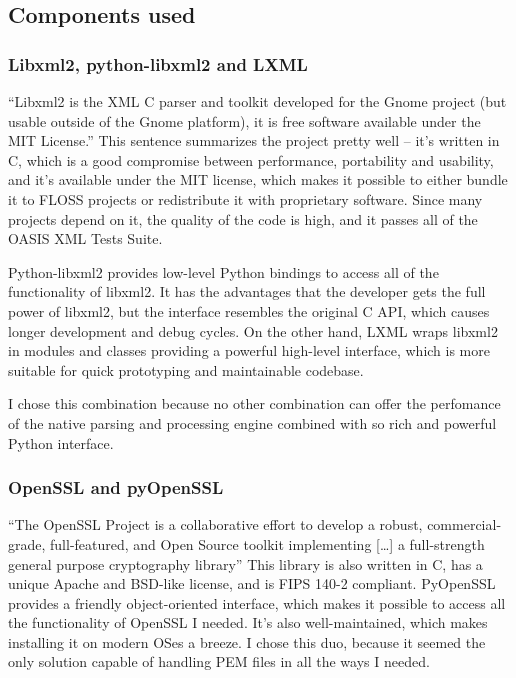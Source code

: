 \subsection{Components used}

\subsubsection{Libxml2, python-libxml2 and LXML}

``Libxml2 is the XML C parser and toolkit developed for the Gnome project (but usable outside of the Gnome platform), it is free software available under the MIT License.''\cite{libxml2-homepage} This sentence summarizes the project pretty well -- it's written in C, which is a good compromise between performance, portability and usability, and it's available under the MIT license, which makes it possible to either bundle it to FLOSS projects or redistribute it with proprietary software. Since many projects depend on it, the quality of the code is high, and it passes all of the OASIS XML Tests Suite.

Python-libxml2 provides low-level Python bindings to access all of the functionality of libxml2. It has the advantages that the developer gets the full power of libxml2, but the interface resembles the original C API, which causes longer development and debug cycles. On the other hand, LXML wraps libxml2 in modules and classes providing a powerful high-level interface, which is more suitable for quick prototyping and maintainable codebase.

I chose this combination because no other combination can offer the perfomance of the native parsing and processing engine combined with so rich and powerful Python interface.

\subsubsection{OpenSSL and pyOpenSSL}

``The OpenSSL Project is a collaborative effort to develop a robust, commercial-grade, full-featured, and Open Source toolkit implementing [\ldots] a full-strength general purpose cryptography library''\cite{openssl-homepage} This library is also written in C, has a unique Apache and BSD-like license, and is FIPS 140-2 compliant. PyOpenSSL provides a friendly object-oriented interface, which makes it possible to access all the functionality of OpenSSL I needed. It's also well-maintained, which makes installing it on modern OSes a breeze. I chose this duo, because it seemed the only solution capable of handling PEM files in all the ways I needed.

